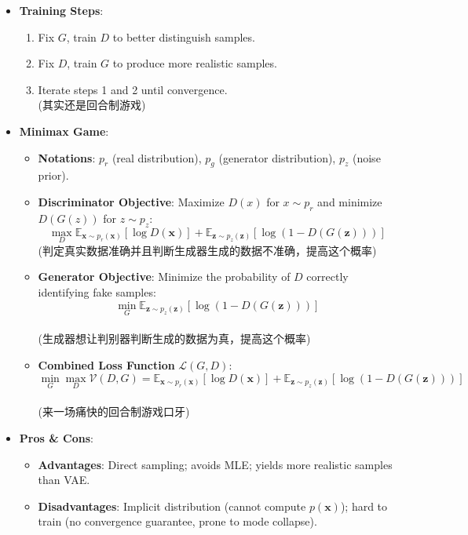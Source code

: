 \documentclass[UTF8]{ctexart}
\begin{document}
\begin{itemize}
    \item \textbf{Training Steps}:
    \begin{enumerate}
        \item Fix $G$, train $D$ to better distinguish samples.
        \item Fix $D$, train $G$ to produce more realistic samples.
        \item Iterate steps 1 and 2 until convergence.\\
        (其实还是回合制游戏)
    \end{enumerate}
    \item \textbf{Minimax Game}:
    \begin{itemize}
        \item \textbf{Notations}: $p_r$ (real distribution), $p_g$ (generator distribution), $p_z$ (noise prior).
        \item \textbf{Discriminator Objective}: Maximize $D(x)$ for $x \sim p_r$ and minimize $D(G(z))$ for $z \sim p_z$:
        $$\max_D \mathbb{E}_{\mathbf{x} \sim p_r(\mathbf{x})}[\log D(\mathbf{x})] + \mathbb{E}_{\mathbf{z} \sim p_z(\mathbf{z})}[\log(1 - D(G(\mathbf{z})))]$$
        (判定真实数据准确并且判断生成器生成的数据不准确，提高这个概率)
        \item \textbf{Generator Objective}: Minimize the probability of $D$ correctly identifying fake samples:
        $$\min_G \mathbb{E}_{\mathbf{z} \sim p_z(\mathbf{z})}[\log(1 - D(G(\mathbf{z})))]$$ \\
        (生成器想让判别器判断生成的数据为真，提高这个概率)
        \item \textbf{Combined Loss Function} $\mathcal{L}(G, D)$:
        $$\min_G \max_D \mathcal{V}(D, G) = \mathbb{E}_{\mathbf{x} \sim p_r(\mathbf{x})}[\log D(\mathbf{x})] + \mathbb{E}_{\mathbf{z} \sim p_z(\mathbf{z})}[\log(1 - D(G(\mathbf{z})))]$$\\
        (来一场痛快的回合制游戏口牙)
    \end{itemize}

    \item \textbf{Pros \& Cons}:
    \begin{itemize}
        \item \textbf{Advantages}: Direct sampling; avoids MLE; yields more realistic samples than VAE.
        \item \textbf{Disadvantages}: Implicit distribution (cannot compute $p(\mathbf{x})$); hard to train (no convergence guarantee, prone to mode collapse).
    \end{itemize}
\end{itemize}
\end{document}
